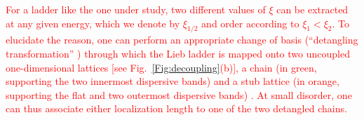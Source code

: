 \documentclass[prl,aps,twocolumn,showpacs,superscriptaddress,longbibliography]{revtex4-1}
\newcommand{\rme}[1]{{\rm{e}}^{#1}}
\newcommand{\changer}[1]{\textcolor{red}{#1}}
\begin{document}
\changer{For a ladder like the one under study, two different values of $\xi$ can be extracted at any given energy, which we denote by $\xi_{1/2}$ and order according to $\xi_1 < \xi_2$. To elucidate the reason, one can perform an appropriate change of basis (``detangling transformation'' \cite{a_Flach_EPL_14,Leykam2017}) through which the Lieb ladder is mapped onto two uncoupled one-dimensional lattices [see Fig.~\ref{Fig:decoupling}(b)], a chain (in green, supporting the two innermost dispersive bands) and a stub lattice (in orange, supporting the flat and two outermost dispersive bands) \cite{SM}. At small disorder, one can thus associate either localization length to one of the two detangled chains.}
%
%
%
%
\end{document}
